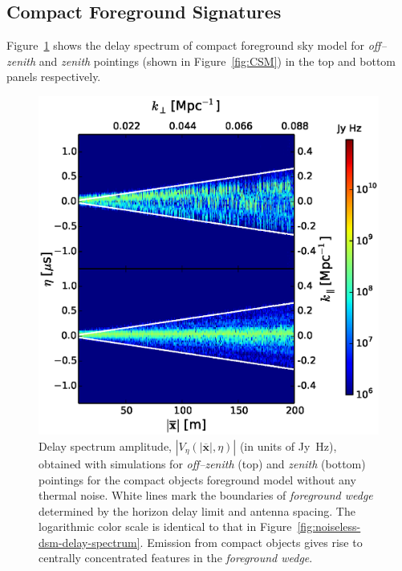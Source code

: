 \documentclass[preprint2,iop,numberedappendix]{emulateapj}
\begin{document}
\subsection{Compact Foreground Signatures}\label{sec:compact}

Figure~\ref{fig:noiseless-csm-delay-spectrum} shows the delay spectrum of compact foreground sky model for {\it off--zenith} and {\it zenith} pointings (shown in Figure~\ref{fig:CSM}) in the top and bottom panels respectively. 

\begin{figure}[htb]
\centering
\includegraphics[width=\linewidth]{figures/v1_0/delta_array_multi_baseline_CLEAN_noiseless_visibilities_0.3m_ground_custom_gaussian_FG_model_csm_all_sky_nside_64_Tsys_90.0K_185.0_MHz_30.7_MHz_bnw2.0.eps}
\caption{Delay spectrum amplitude, $|V_\eta(|\overline{\mathbf{x}}|,\eta)|$ (in units of Jy~Hz), obtained with simulations for {\it off--zenith} (top) and {\it zenith} (bottom) pointings for the compact objects foreground model without any thermal noise. White lines mark the boundaries of {\it foreground wedge} determined by the horizon delay limit and antenna spacing. The logarithmic color scale is identical to that in Figure~\ref{fig:noiseless-dsm-delay-spectrum}. Emission from compact objects gives rise to centrally concentrated features in the {\it foreground wedge}.\label{fig:noiseless-csm-delay-spectrum}}
\end{figure}
\end{document}
